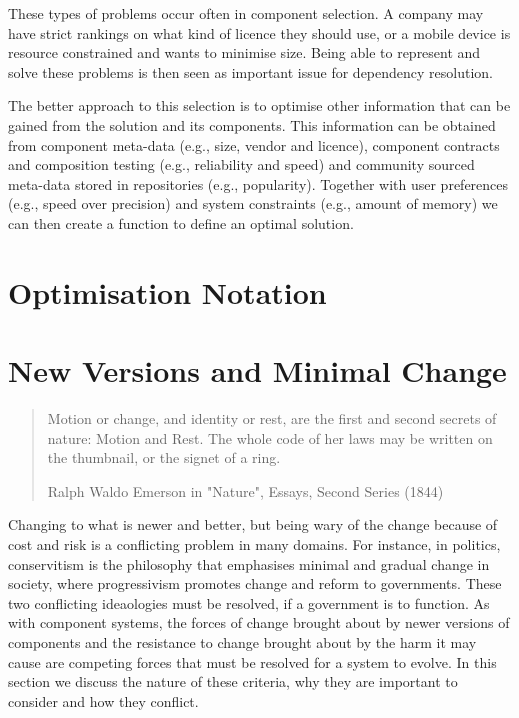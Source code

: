 These types of problems occur often in component selection.
A company may have strict rankings on what kind of licence they should use, 
or a mobile device is resource constrained and wants to minimise size.
Being able to represent and solve these problems is then seen as important issue for dependency resolution.


The better approach to this selection is to optimise other information that can be gained from the solution and its components. 
This information can be obtained from component meta-data (e.g., size, vendor and licence),
component contracts and composition testing (e.g., reliability and speed) and community sourced meta-data stored in repositories (e.g., popularity).
Together with user preferences (e.g., speed over precision) and system constraints (e.g., amount of memory) 
we can then create a function to define an optimal solution.


\section{Optimisation Notation}



\section{New Versions and Minimal Change}
\begin{quotation}
Motion or change, and identity or rest, are the first and second secrets of nature: Motion and Rest. 
The whole code of her laws may be written on the thumbnail, or the signet of a ring.

Ralph Waldo Emerson in "Nature", Essays, Second Series (1844)
\end{quotation}

Changing to what is newer and better, but being wary of the change because of cost and risk is a conflicting problem in many domains.
For instance, in politics, conservitism is the philosophy that emphasises minimal and gradual change in society, %
where progressivism promotes change and reform to governments.
These two conflicting ideaologies must be resolved, if a government is to function. 
As with component systems, 
the forces of change brought about by newer versions of components and the resistance to change brought about by the harm it may cause
are competing forces that must be resolved for a system to evolve.
In this section we discuss the nature of these criteria, why they are important to consider and how they conflict.


